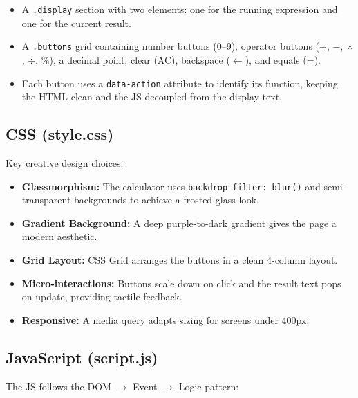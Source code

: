 \documentclass[12pt,a4paper]{article}
\begin{document}
\begin{itemize}
  \item A \texttt{.display} section with two elements: one for the running expression and one for the current result.
  \item A \texttt{.buttons} grid containing number buttons (0--9), operator buttons (+, $-$, $\times$, $\div$, \%), a decimal point, clear (AC), backspace ($\leftarrow$), and equals (=).
  \item Each button uses a \texttt{data-action} attribute to identify its function, keeping the HTML clean and the JS decoupled from the display text.
\end{itemize}

\subsection{CSS (style.css)}
Key creative design choices:

\begin{itemize}
  \item \textbf{Glassmorphism:} The calculator uses \texttt{backdrop-filter: blur()} and semi-transparent backgrounds to achieve a frosted-glass look.
  \item \textbf{Gradient Background:} A deep purple-to-dark gradient gives the page a modern aesthetic.
  \item \textbf{Grid Layout:} CSS Grid arranges the buttons in a clean 4-column layout.
  \item \textbf{Micro-interactions:} Buttons scale down on click and the result text pops on update, providing tactile feedback.
  \item \textbf{Responsive:} A media query adapts sizing for screens under 400px.
\end{itemize}

\subsection{JavaScript (script.js)}
The JS follows the DOM $\rightarrow$ Event $\rightarrow$ Logic pattern:
\end{document}
